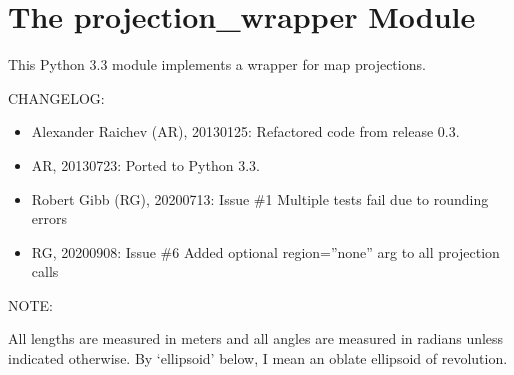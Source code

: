 \documentclass[a4paper,12ptopenany,oneside,english]{sphinxmanual}
\begin{document}
\begin{fulllineitems}
\begin{fulllineitems}
\begin{description}
\end{description}

\end{fulllineitems}


\end{fulllineitems}


\sphinxstepscope


\chapter{The projection\_wrapper Module}
\label{\detokenize{projection_wrapper:module-rhealpixdggs.projection_wrapper}}\label{\detokenize{projection_wrapper:the-projection-wrapper-module}}\label{\detokenize{projection_wrapper::doc}}
\sphinxAtStartPar
This Python 3.3 module implements a wrapper for map projections.

\sphinxAtStartPar
CHANGELOG:
\begin{itemize}
\item {} 
\sphinxAtStartPar
Alexander Raichev (AR), 2013\sphinxhyphen{}01\sphinxhyphen{}25: Refactored code from release 0.3.

\item {} 
\sphinxAtStartPar
AR, 2013\sphinxhyphen{}07\sphinxhyphen{}23: Ported to Python 3.3.

\item {} 
\sphinxAtStartPar
Robert Gibb (RG), 2020\sphinxhyphen{}07\sphinxhyphen{}13: Issue \#1 Multiple tests fail due to rounding errors

\item {} 
\sphinxAtStartPar
RG, 2020\sphinxhyphen{}09\sphinxhyphen{}08: Issue \#6 Added optional region=”none” arg to all projection calls

\end{itemize}

\sphinxAtStartPar
NOTE:

\sphinxAtStartPar
All lengths are measured in meters and all angles are measured in radians
unless indicated otherwise.
By ‘ellipsoid’ below, I mean an oblate ellipsoid of revolution.
\end{document}
